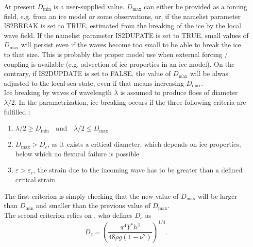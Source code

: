 \noindent
At present $D_{\min}$ is a user-supplied value. $D_{\max}$ can either be 
provided as a forcing field, e.g. from an 
ice model or some observations, or, if the namelist parameter {\code IS2BREAK} is set to {\code TRUE}, 
estimated from 
the breaking of the ice by the local wave field. If the namelist parameter {\code IS2DUPATE}  is set to  
{\code TRUE}, small values of $D_{\max}$ will persist even if the waves become too small to be able to break the ice to 
that size. This is probably the proper model 
use when  external forcing / coupling is available (e.g. advection of ice properties in an ice model). 
 On the contrary, if {\code IS2DUPDATE} is set to  {\code FALSE}, the value of $D_{\max}$ will be alwas adjusted to the local sea state, 
even if that means increasing $D_{\max}$.\\

\noindent
Ice breaking by waves of wavelength $\lambda$ is assumed to produce floes of diameter $\lambda / 2$. 
In the parametrization, ice breaking occurs if the three following criteria are fulfilled \citep{art:Wea13}:
\begin{enumerate}
\item $\lambda/2 \geq D_{\min} \quad \mathrm{and} \quad  \lambda/2 \leq D_{\max}$
\item $D_{\max}>D_c$, as it exists a critical diameter, which depends on ice properties, below which no flexural failure is possible
\item $\varepsilon>\varepsilon_c$, the strain due to the incoming wave has to 
be greater than a defined critical strain
\end{enumerate}
The first criterion is simply checking that the new value of $D_{\max}$ will be larger than $D_{\min}$ and smaller 
than the previous value of $D_{\max}$.\\

\noindent
The second criterion relies on \cite{inc:M86}, who defines $D_{c}$ as
\begin{equation}
D_{c}=\left(\frac{\pi^4 Y^* h^3}{48 \rho g (1 -\nu ^2)}\right)^{1/4}. 
\end{equation}
 


